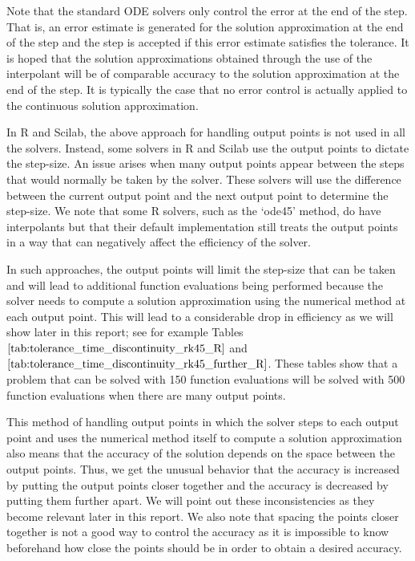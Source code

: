 Note that the standard ODE solvers only control the error at the end of the step. That is, an error estimate is generated for the solution approximation at the end of the step and the step is accepted if this error estimate satisfies the tolerance. It is hoped that the solution approximations obtained through the use of the interpolant will be of comparable accuracy to the solution approximation at the end of the step. It is typically the case that no error control is actually applied to the continuous solution approximation.

In R and Scilab, the above approach for handling output points is not used in all the solvers. Instead, some solvers in R and Scilab use the output points to dictate the step-size. An issue arises when many output points appear between the steps that would normally be taken by the solver. These solvers will use the difference between the current output point and the next output point to determine the step-size. We note that some R solvers, such as the `ode45' method, do have interpolants but that their default implementation still treats the output points in a way that can negatively affect the efficiency of the solver. 

In such approaches, the output points will limit the step-size that can be taken and will lead to additional function evaluations being performed because the solver needs to compute a solution approximation using the numerical method at each output point. This will lead to a considerable drop in efficiency as we will show later in this report; see for example Tables $\ref{tab:tolerance_time_discontinuity_rk45_R}$ and $\ref{tab:tolerance_time_discontinuity_rk45_further_R}$. These tables show that a problem that can be solved with 150 function evaluations will be solved with 500 function evaluations when there are many output points. 

This method of handling output points in which the solver steps to each output point and uses the numerical method itself to compute a solution approximation also means that the accuracy of the solution depends on the space between the output points. Thus, we get the unusual behavior that the accuracy is increased by putting the output points closer together and the accuracy is decreased by putting them further apart. We will point out these inconsistencies as they become relevant later in this report. We also note that spacing the points closer together is not a good way to control the accuracy as it is impossible to know beforehand how close the points should be in order to obtain a desired accuracy.

